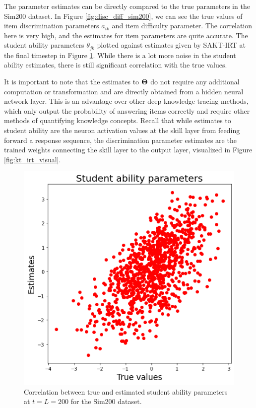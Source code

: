The parameter estimates can be directly compared to the true parameters in the Sim200 dataset. In Figure \ref{fig:disc_diff_sim200}, we can see the true values of item discrimination parameters $a_{ik}$ and item difficulty parameter. The correlation here is very high, and the estimates for item parameters are quite accurate. The student ability parameters $\theta_{jk}$ plotted against estimates given by SAKT-IRT at the final timestep in Figure \ref{fig:theta_sim200}. While there is a lot more noise in the student ability estimates, there is still significant correlation with the true values. 

It is important to note that the estimates to $\boldsymbol{\Theta}$ do not require any additional computation or transformation and are directly obtained from a hidden neural network layer. This is an advantage over other deep knowledge tracing methods, which only output the probability of answering items correctly and require other methods of quantifying knowledge concepts. Recall that while estimates to student ability are the neuron activation values at the skill layer from feeding forward a response sequence, the discrimination parameter estimates are the trained weights connecting the skill layer to the output layer, visualized in Figure \ref{fig:kt_irt_visual}.

\begin{figure}[h]
  \centering
  \includegraphics[width=.5\textwidth]{img/kt_irt/theta_est_attn2.png}
  \caption{Correlation between true and estimated student ability parameters at $t=L=200$ for the Sim200 dataset.}
  \label{fig:theta_sim200}
\end{figure}


